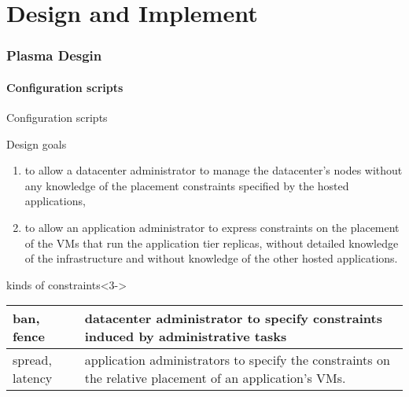 \part{Design and Implement} 
\section{Plasma Desgin} 
\subsection{Configuration scripts} 

\begin{frame}{Configuration scripts}

\begin{block}{Design goals}
\begin{enumerate}
\item<1-> to allow a datacenter
administrator to manage the datacenter’s nodes without any knowledge of the
placement constraints specified by the hosted applications, 
\item<2-> to allow an application administrator to express constraints on the 
placement of the VMs that run the application tier replicas, without detailed 
knowledge of the infrastructure and without knowledge of the other hosted 
applications.
\end{enumerate}
\end{block}

\begin{block}{kinds of constraints}<3->
\begin{center}
\begin{tabular}{|l|l|}
\hline
ban, fence & 
\begin{minipage}[c]{0.7\textwidth}
datacenter administrator to specify constraints induced by administrative tasks
\end{minipage}
\\
\hline
spread, latency & 
\begin{minipage}[c]{0.7\textwidth}
application administrators to specify the constraints on the relative placement of an application’s VMs.
\end{minipage}
\\
\hline
\end{tabular}
\end{center}
\end{block}
\end{frame}


